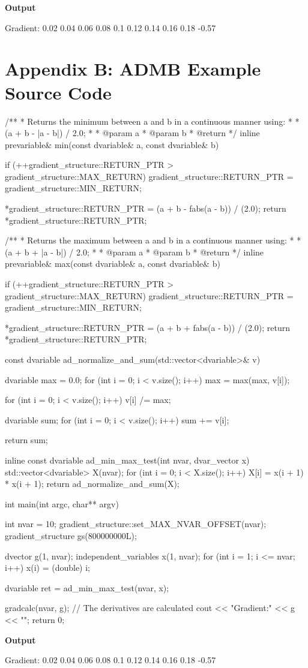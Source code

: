 \documentclass[oneside]{article}
\begin{document}
\textbf{Output}
\begin{myoutput}
Gradient:
0.02 0.04 0.06 0.08 0.1 0.12 0.14 0.16 0.18 -0.57 
\end{myoutput}

\section{Appendix B: ADMB Example Source Code}


\begin{cppsource}
/**
 * Returns the minimum between a and b in a continuous manner using:
 * 
 * (a + b - |a - b|) / 2.0;
 * 
 * @param a
 * @param b
 * @return 
 */
inline prevariable& min(const dvariable& a, const dvariable& b) {
    if (++gradient_structure::RETURN_PTR > gradient_structure::MAX_RETURN)
        gradient_structure::RETURN_PTR = gradient_structure::MIN_RETURN;

    *gradient_structure::RETURN_PTR = (a + b - fabs(a - b)) / (2.0);
    return *gradient_structure::RETURN_PTR;
}

/**
 * Returns the maximum between a and b in a continuous manner using:
 * 
 * (a + b + |a - b|) / 2.0;
 * 
 * @param a
 * @param b
 * @return 
 */
inline prevariable& max(const dvariable& a, const dvariable& b) {
    if (++gradient_structure::RETURN_PTR > gradient_structure::MAX_RETURN)
        gradient_structure::RETURN_PTR = gradient_structure::MIN_RETURN;

    *gradient_structure::RETURN_PTR = (a + b + fabs(a - b)) / (2.0);
    return *gradient_structure::RETURN_PTR;
}

const dvariable ad_normalize_and_sum(std::vector<dvariable>& v) {
    dvariable max = 0.0;
    for (int i = 0; i < v.size(); i++) {
        max = max(max, v[i]);
    }

    for (int i = 0; i < v.size(); i++) {
        v[i] /= max;
    }

    dvariable sum;
    for (int i = 0; i < v.size(); i++) {
        sum += v[i];
    }

    return sum;
}
\end{cppsource}

\begin{cppsource}
inline const dvariable ad_min_max_test(int nvar, dvar_vector x) {
    std::vector<dvariable> X(nvar);
    for (int i = 0; i < X.size(); i++) {
        X[i] = x(i + 1) * x(i + 1);
    }
    return ad_normalize_and_sum(X);
}

int main(int argc, char** argv) {
    int nvar = 10;
    gradient_structure::set_MAX_NVAR_OFFSET(nvar);
    gradient_structure gs(800000000L);

    dvector g(1, nvar);
    independent_variables x(1, nvar);
    for (int i = 1; i <= nvar; i++) {
        x(i) = (double) i;
    }



    dvariable ret = ad_min_max_test(nvar, x);
    
    gradcalc(nvar, g); // The derivatives are calculated
    cout << "Gradient:\n" << g << "\n";
    return 0;
}
\end{cppsource}
\textbf{Output}
\begin{myoutput}
Gradient:
0.02 0.04 0.06 0.08 0.1 0.12 0.14 0.16 0.18 -0.57 
\end{myoutput}
\end{document}
